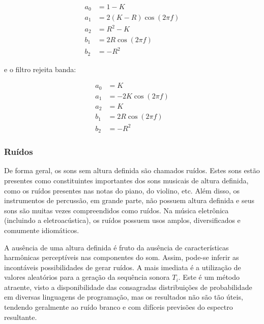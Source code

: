 \begin{enumerate}
\begin{equation}\label{eq:passa-banda}
\begin{split}
a_0 & =  1 - K \\
a_1 & =  2(K-R)\cos (2\pi f) \\
a_2 & =  R^2-K \\
b_1 & =  2R \cos (2\pi f) \\
b_2 & =  -R^2
\end{split}
\end{equation}

e o filtro rejeita banda:

\begin{equation}\label{eq:rejeita-banda}
\begin{split}
a_0 & =  K \\
a_1 & =  -2K\cos (2\pi f) \\
a_2 & =  K \\
b_1 & =  2R \cos (2\pi f) \\
b_2 & =  -R^2
\end{split}
\end{equation}



\end{enumerate}

\subsubsection{Ruídos}
De forma geral, os sons sem altura definida 
são chamados ruídos.
Estes sons estão presentes como constituintes importantes dos sons musicais de altura definida,
como os ruídos presentes nas notas do piano, do violino, etc. Além disso, os instrumentos
de percussão, em grande parte, não possuem altura definida e seus sons
são muitas vezes compreendidos como ruídos. Na música eletrônica (incluindo
a eletroacústica), os ruídos possuem usos amplos, diversificados e comumente
idiomáticos.

A ausência de uma altura definida é fruto da ausência de características
harmônicas perceptíveis nas componentes do som. Assim, pode-se inferir
as incontáveis possibilidades de gerar ruídos. A mais imediata é a utilização
de valores aleatórios para a geração da sequência sonora $T_i$. Este
é um método atraente, visto a disponibilidade
das consagradas distribuições de probabilidade em diversas linguagens de programação,
mas os resultados não são tão úteis, tendendo geralmente ao ruído branco
e com difíceis previsões do espectro resultante.

